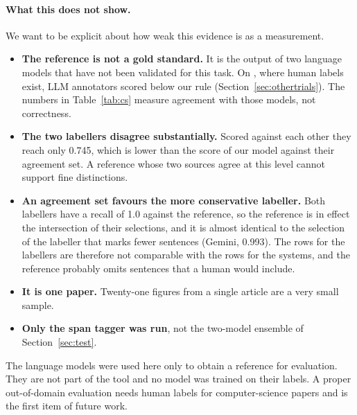 \paragraph{What this does not show.} We want to be explicit about how weak this evidence is as a measurement.
\begin{itemize}
  \item \textbf{The reference is not a gold standard.} It is the output of two language models that have not
        been validated for this task. On \figsum{}, where human labels exist, LLM annotators scored below our
        rule (Section~\ref{sec:othertrials}). The numbers in Table~\ref{tab:cs} measure agreement with those
        models, not correctness.
  \item \textbf{The two labellers disagree substantially.} Scored against each other they reach only 0.745,
        which is lower than the score of our model against their agreement set. A reference whose two sources
        agree at this level cannot support fine distinctions.
  \item \textbf{An agreement set favours the more conservative labeller.} Both labellers have a recall of
        1.0 against the reference, so the reference is in effect the intersection of their selections, and it
        is almost identical to the selection of the labeller that marks fewer sentences (Gemini, 0.993). The
        rows for the labellers are therefore not comparable with the rows for the systems, and the reference
        probably omits sentences that a human would include.
  \item \textbf{It is one paper.} Twenty-one figures from a single article are a very small sample.
  \item \textbf{Only the span tagger was run}, not the two-model ensemble of Section~\ref{sec:test}.
\end{itemize}
The language models were used here only to obtain a reference for evaluation. They are not part of the tool
and no model was trained on their labels. A proper out-of-domain evaluation needs human labels for
computer-science papers and is the first item of future work.
